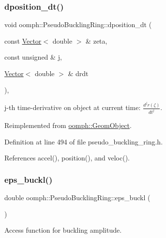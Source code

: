 \subsubsection{\texorpdfstring{dposition\+\_\+dt()}{dposition\_dt()}}
{\footnotesize\ttfamily void oomph\+::\+Pseudo\+Buckling\+Ring\+::dposition\+\_\+dt (\begin{DoxyParamCaption}\item[{const \hyperlink{classoomph_1_1Vector}{Vector}$<$ double $>$ \&}]{zeta,  }\item[{const unsigned \&}]{j,  }\item[{\hyperlink{classoomph_1_1Vector}{Vector}$<$ double $>$ \&}]{drdt }\end{DoxyParamCaption})\hspace{0.3cm}{\ttfamily [inline]}, {\ttfamily [virtual]}}



j-\/th time-\/derivative on object at current time\+: $ \frac{d^{j} r(\zeta)}{dt^j} $. 



Reimplemented from \hyperlink{classoomph_1_1GeomObject_aa46469e491d25eda8dbe213f07152974}{oomph\+::\+Geom\+Object}.



Definition at line 494 of file pseudo\+\_\+buckling\+\_\+ring.\+h.



References accel(), position(), and veloc().

\mbox{\label{classoomph_1_1PseudoBucklingRing_ad28891383abe71a473a079721c6dd53e}} 
\subsubsection{\texorpdfstring{eps\+\_\+buckl()}{eps\_buckl()}}
{\footnotesize\ttfamily double oomph\+::\+Pseudo\+Buckling\+Ring\+::eps\+\_\+buckl (\begin{DoxyParamCaption}{ }\end{DoxyParamCaption})\hspace{0.3cm}{\ttfamily [inline]}}



Access function for buckling amplitude. 



